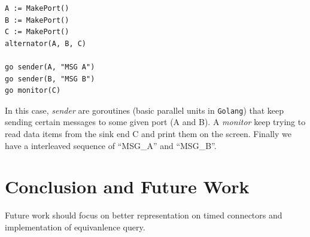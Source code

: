 \documentclass[conference, a4paper]{IEEEtran}
\begin{document}
\begin{lstlisting}
A := MakePort()
B := MakePort()
C := MakePort()
alternator(A, B, C)

go sender(A, "MSG A")
go sender(B, "MSG B")
go monitor(C)
\end{lstlisting}

In this case, \emph{sender} are goroutines (basic parallel units in \texttt{Golang}) that keep
sending certain messages to some given port (A and B). A \emph{monitor} keep trying to read data
items from the sink end C and print them on the screen. Finally we have a interleaved sequence of
``MSG\_A'' and ``MSG\_B''.
 
\section{Conclusion and Future Work}
Future work should focus on better representation on timed connectors and implementation of
equivanlence query.




\listoftodos
\end{document}
